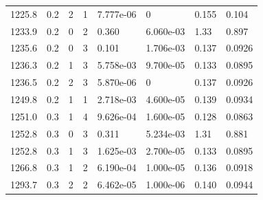 \documentclass[preview]{standalone}
\begin{document}
{{{{\begin{tabular}{L{1.2cm}C{1.2cm} C{0.3cm}C{0.5cm} C{1.4cm}C{1.4cm} C{1.4cm}C{1.4cm}}
  1225.8  &   0.2  & 2     &  1 &  7.777e-06  & 0  & 0.155 &  0.104   \\ 
  1233.9  &   0.2  & 0     &  2 &  0.360  & 6.060e-03  & 1.33 &  0.897   \\ 
  1235.6  &   0.2  & 0     &  3 &  0.101  & 1.706e-03  & 0.137 &  0.0926   \\ 
  1236.3  &   0.2  & 1     &  3 &  5.758e-03  & 9.700e-05  & 0.133 &  0.0895   \\ 
  1236.5  &   0.2  & 2     &  3 &  5.870e-06  & 0  & 0.137 &  0.0926   \\ 
  1249.8  &   0.2  & 1     &  1 &  2.718e-03  & 4.600e-05  & 0.139 &  0.0934   \\ 
  1251.0  &   0.3  & 1     &  4 &  9.626e-04  & 1.600e-05  & 0.128 &  0.0863   \\ 
  1252.8  &   0.3  & 0     &  3 &  0.311  & 5.234e-03  & 1.31 &  0.881   \\ 
  1252.8  &   0.3  & 1     &  3 &  1.625e-03  & 2.700e-05  & 0.133 &  0.0895   \\ 
  1266.8  &   0.3  & 1     &  2 &  6.190e-04  & 1.000e-05  & 0.136 &  0.0918   \\ 
  1293.7  &   0.3  & 2     &  2 &  6.462e-05  & 1.000e-06  & 0.140 &  0.0944   \\ 
\hline 
\end{tabular} 

}}}}
\end{document}

